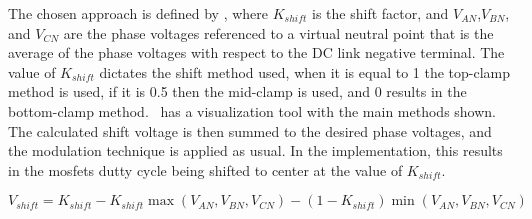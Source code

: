 The chosen approach is defined by , where $K_{shift}$ is the shift factor, and $V_{AN}$,$V_{BN}$, and $V_{CN}$ are the phase voltages referenced to a virtual neutral point that is the average of the phase voltages with respect to the DC link negative terminal. The value of $K_{shift}$ dictates the shift method used, when it is equal to 1 the top-clamp method is used, if it is 0.5 then the mid-clamp is used, and 0 results in the bottom-clamp method.~\citet{Microchip:ZSM_viewer:2023} has a visualization tool with the main methods shown. The calculated shift voltage is then summed to the desired phase voltages, and the modulation technique is applied as usual. In the implementation, this results in the \glspl{mosfet} dutty cycle being shifted to center at the value of $K_{shift}$.

\begin{equation}
	V_{shift} = K_{shift} - K_{shift} \max \left(V_{AN},V_{BN},V_{CN}\right) - (1-K_{shift}) \min \left(V_{AN},V_{BN},V_{CN}\right)
	\label{eq:neutral_point_shift}
\end{equation}
